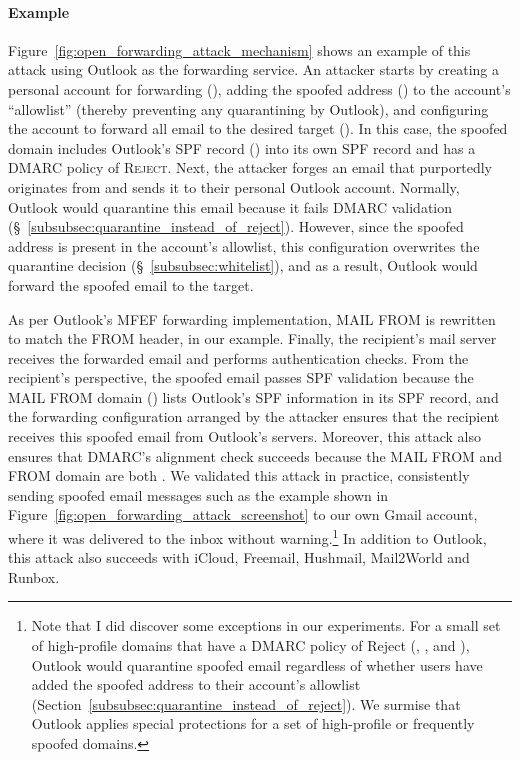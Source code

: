 \paragraph{Example}
Figure~\ref{fig:open_forwarding_attack_mechanism} shows an example of
this attack using Outlook as the forwarding service.
An attacker starts by creating a personal account for
forwarding (), adding the spoofed address
() to the account's ``allowlist'' (thereby
preventing any quarantining by Outlook), and configuring the account to
forward all email to the desired target (). In this case, the spoofed domain  includes
Outlook's SPF record () into its own SPF record and has a DMARC policy of \textsc{Reject}. Next, the attacker forges an email that purportedly originates from  and sends it to their personal Outlook account. Normally, Outlook would quarantine this email because it fails DMARC validation (\S~\ref{subsubsec:quarantine_instead_of_reject}). However, since the spoofed address is present in the account's allowlist, this configuration overwrites the quarantine decision (\S~\ref{subsubsec:whitelist}), and as a result, Outlook would forward the spoofed email to the target.


As per Outlook's MFEF forwarding implementation,
\textsc{MAIL FROM}
is rewritten to match the
\textsc{FROM} header,  in our example. Finally, the recipient's mail server receives the forwarded email
and performs authentication checks.
From the recipient's perspective,
the spoofed email passes SPF validation because the
\textsc{MAIL FROM} domain () lists Outlook's SPF
information in its SPF record, and the forwarding configuration
arranged by the attacker ensures that the recipient receives this
spoofed email from Outlook's servers.
Moreover, this attack also
ensures that DMARC's alignment check succeeds because the
\textsc{MAIL FROM} and \textsc{FROM} domain are both .
We validated this attack in practice, consistently sending
spoofed email messages such as the example
shown in Figure~\ref{fig:open_forwarding_attack_screenshot}
to our own Gmail account, where it was delivered to the inbox without warning.\footnote{
Note that I did discover some exceptions in our experiments.
For a small set of high-profile domains that have a DMARC policy of Reject
(\eg, ,  and ), Outlook would
quarantine spoofed email regardless of whether users have added the
spoofed address to their account's allowlist (Section~\ref{subsubsec:quarantine_instead_of_reject}).
We surmise that Outlook applies special protections for a set of high-profile or frequently spoofed domains.
} 
In addition to Outlook, this attack also succeeds with
iCloud, Freemail, Hushmail, Mail2World and Runbox.


